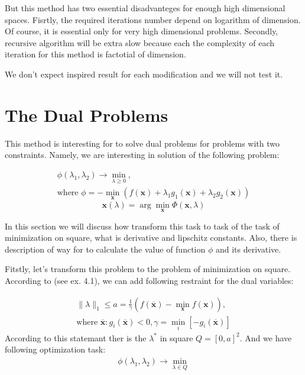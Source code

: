 \documentclass[12pt]{article}
\begin{document}
But this method has two essential disadvanteges for enough high dimensional spaces. Fisrtly, the required iterations number depend on logarithm of dimension. Of course, it is essential only for very high dimensional problems. Secondly, recursive algorithm will be extra slow because each the complexity of each iteration for this method is factotial of dimension.

We don't expect inspired result for each modification and we will not test it.

\section{The Dual Problems}
\label{details}

This method is interesting for to solve dual problems for problems with two constraints. Namely, we are interesting in solution of the following problem:

\begin{gather}
\phi(\lambda_1, \lambda_2) \rightarrow \min_{\lambda\geq 0},\\
\text{where } \phi = -\min_\textbf{x}\left(f(\textbf{x}) + \lambda_1 g_1(\textbf{x}) + \lambda_2 g_2(\textbf{x})\right)
\end{gather}
$$\textbf{x}(\lambda) = \arg\min_\textbf{x}\Phi(\textbf{x}, \lambda)$$

In this section we will discuss how transform this task to task of the task of minimization on square, what is derivative and lipschitz constants. Also, there is description of way for to calculate the value of function $\phi$ and its derivative.

Fitstly, let's transform this problem to the problem of minimization on square. According to \cite{task} (see ex. 4.1), we can add following restraint for the dual variables:

\begin{gather}
\label{restr:dual}
\|{\lambda}\|_1 \leq a = \frac{1}{\gamma}\left(f(\overline{\textbf{x}}) -\min\limits_{\textbf{x}}f(\textbf{x})\right),\\
\text{where $\overline{\textbf{x}}:g_i(\overline{\textbf{x}})<0,\gamma = \min\limits_i[-g_i(\overline{\textbf{x}})]$}
\end{gather}
According to this statemant ther is the $\lambda^*$ in square $Q = [0, a]^2$. And we have following optimization task:
\begin{gather}
\label{dual}
\phi(\lambda_1, \lambda_2) \rightarrow \min_{\lambda \in Q}
\end{gather}
\end{document}
